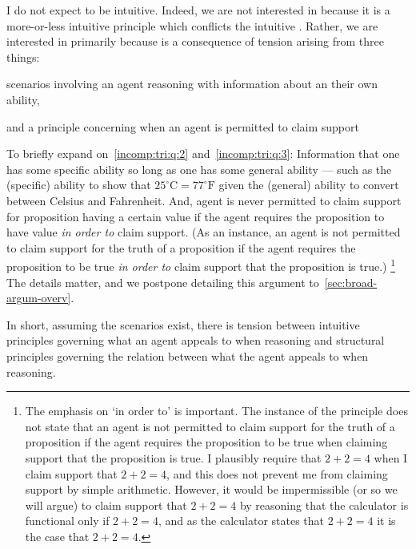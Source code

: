 \begin{note}
  \color{details}
  I do not expect \EAS{} to be intuitive.
  Indeed, we are not interested in \EAS{} because it is a more-or-less intuitive principle which conflicts the intuitive \ESU{}.
  Rather, we are interested in \EAS{} primarily because \EAS{} is a consequence of tension arising from three things:
  \begin{enumerate*}
  \item\label{incomp:tri:q:1} \ESU{}
  \item\label{incomp:tri:q:2} scenarios involving an agent reasoning with information about an their own ability,
  \item\label{incomp:tri:q:3} and a principle concerning when an agent is permitted to claim support
  \end{enumerate*}
  To briefly expand on~\ref{incomp:tri:q:2} and~\ref{incomp:tri:q:3}:
  Information that one has some specific ability so long as one has some general ability --- such as the (specific) ability to show that \(25^{\circ}\text{C} = 77^{\circ}\text{F}\) given the (general) ability to convert between Celsius and Fahrenheit.
  And, agent is never permitted to claim support for proposition having a certain value if the agent requires the proposition to have value \emph{in order to} claim support.
  (As an instance, an agent is not permitted to claim support for the truth of a proposition if the agent requires the proposition to be true \emph{in order to} claim support that the proposition is true.)\nolinebreak
  \footnote{
    The emphasis on `in order to' is important.
    The instance of the principle does not state that an agent is not permitted to claim support for the truth of a proposition if the agent requires the proposition to be true when claiming support that the proposition is true.
    I plausibly require that \(2 + 2 = 4\) when I claim support that \(2 + 2 = 4\), and this does not prevent me from claiming support by simple arithmetic.
    However, it would be impermissible (or so we will argue) to claim support that \(2 + 2 = 4\) by reasoning that the calculator is functional only if \(2 + 2 = 4\), and as the calculator states that \(2 + 2 = 4\) it is the case that \(2 + 2 = 4\).
  }
  The details matter, and we postpone detailing this argument to~\autoref{sec:broad-argum-overv}.

  In short, assuming the scenarios exist, there is tension between intuitive principles governing what an agent appeals to when reasoning and structural principles governing the relation between what the agent appeals to when reasoning.
\end{note}

